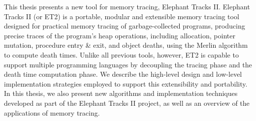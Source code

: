 This thesis presents a new tool for memory tracing, Elephant Tracks II. Elephant Tracks II (or ET2) is a portable, modular and
extensible memory tracing tool designed for practical memory tracing of garbage-collected programs, producing precise traces of the
program's heap operations, including allocation, pointer mutation, procedure entry \& exit, and object deaths, using the Merlin algorithm
\citep{Merlin} to compute death times. Unlike all previous tools, however, ET2 is capable to support multiple programming languages by
decoupling the tracing phase and the death time computation phase. We describe the high-level design and low-level implementation
strategies employed to support this extensibility and portability. In this thesis, we also present new algorithms and implementation
techniques developed as part of the Elephant Tracks II project, as well as an overview of the applications of memory tracing.
